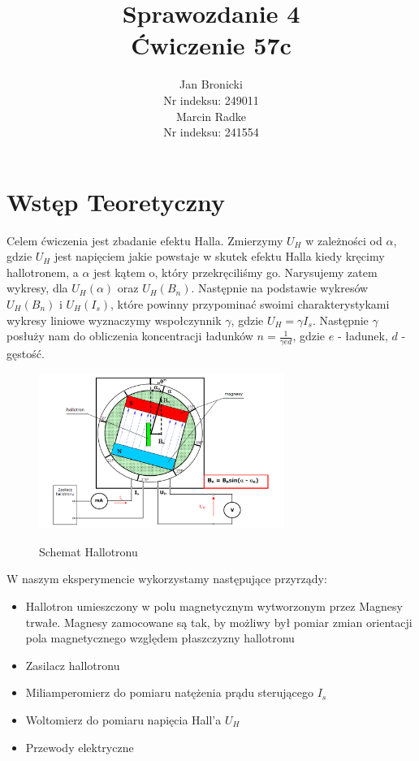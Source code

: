 \documentclass{article}
\title{Sprawozdanie 4\\ Ćwiczenie 57c}
\author{Jan Bronicki \\
Nr indeksu: 249011\\
Marcin Radke\\
Nr indeksu: 241554}
\date{}
\begin{document}
\maketitle
\section{Wstęp Teoretyczny}
\par Celem ćwiczenia jest zbadanie efektu Halla. Zmierzymy $U_{H}$ w zależności od $\alpha$, gdzie $U_{H}$ jest napięciem jakie powstaje w skutek efektu Halla kiedy kręcimy hallotronem, a $\alpha$ jest kątem o, który przekręciliśmy go. Narysujemy zatem wykresy, dla $U_{H}(\alpha)$ oraz $U_{H}(B_{n})$. Następnie na podstawie wykresów $U_{H}(B_{n})$ i $U_{H}(I_{s})$, które powinny przypominać swoimi charakterystykami wykresy liniowe wyznaczymy wspołczynnik $\gamma$, gdzie $U_{H}=\gamma I_{s}$. Następnie $\gamma$ posłuży nam do obliczenia koncentracji ładunków $n=\frac{1}{\gamma e d}$, gdzie $e$ - ładunek, $d$ - gęstość.

\begin{figure}[h]
    \centering
    \caption{Schemat Hallotronu}
    \includegraphics[width=8cm]{schemat_hallotronu.png}
    \label{fig:rys1}
\end{figure}

W naszym eksperymencie wykorzystamy następujące przyrządy:
\begin{itemize}
    \item Hallotron umieszczony w polu magnetycznym wytworzonym przez Magnesy trwałe. Magnesy zamocowane są         tak, by możliwy był pomiar zmian orientacji pola magnetycznego względem płaszczyzny hallotronu
    \item Zasilacz hallotronu
    \item Miliamperomierz do pomiaru natężenia prądu sterującego $I_{s}$
    \item Woltomierz do pomiaru napięcia Hall'a $U_{H}$
    \item Przewody elektryczne
\end{itemize}
\newpage
\end{document}
